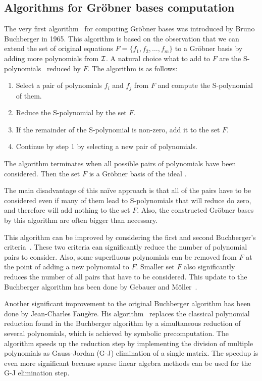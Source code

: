 \subsection{Algorithms for Gr\"obner bases computation}
The very first algorithm~\cite{Buchberger} for computing Gr\"obner bases was introduced by Bruno Buchberger in 1965.
This algorithm is based on the observation that we can extend the set of original equations $F = \{f_1, f_2, \ldots, f_m\}$ to a Gr\"obner basis by adding more polynomials from $\mathcal{I}$.
A natural choice what to add to $F$ are the S-polynomials~\cite{Becker93} reduced by $F$.
The algorithm is as follows:
\begin{enumerate}
  \item Select a pair of polynomials $f_i$ and $f_j$ from $F$ and compute the S-polynomial of them.
  \item Reduce the S-polynomial by the set $F$.
  \item If the remainder of the S-polynomial is non-zero, add it to the set $F$.
  \item Continue by step 1 by selecting a new pair of polynomials.
\end{enumerate}
The algorithm terminates when all possible pairs of polynomials have been considered. Then the set $F$ is a Gr\"obner basis of the ideal \Ideal.

The main disadvantage of this na\"ive approach is that all of the pairs have to be considered even if many of them lead to S-polynomials that will reduce do zero, and therefore will add nothing to the set $F$.
Also, the constructed Gr\"obner bases by this algorithm are often bigger than necessary.

This algorithm can be improved by considering the first and second Buchberger's criteria~\cite{Becker93}.
These two criteria can significantly reduce the number of polynomial pairs to consider.
Also, some superfluous polynomials can be removed from $F$ at the point of adding a new polynomial to $F$.
Smaller set $F$ also significantly reduces the number of all pairs that have to be considered.
This update to the Buchberger algorithm has been done by Gebauer and M\"oller~\cite{Gebauer-Moller88}.

Another significant improvement to the original Buchberger algorithm has been done by Jean-Charles Faug\`ere.
His \FFFF{} algorithm~\cite{F4} replaces the classical polynomial reduction found in the Buchberger algorithm by a simultaneous reduction of several polynomials, which is achieved by symbolic precomputation.
The \FFFF{} algorithm speeds up the reduction step by implementing the division of multiple polynomials as Gauss-Jordan (G-J) elimination of a single matrix.
The speedup is even more significant because sparse linear algebra methods can be used for the G-J elimination step.

